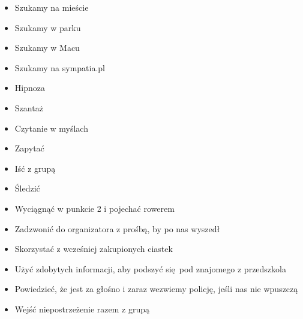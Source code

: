 \documentclass[10pt,a4paper]{protocol}
\begin{document}




\begin{fullwidth}
\makeheader
\end{fullwidth}


\begin{itemize}
	\item Szukamy na mieście
	\item Szukamy w parku
	\item Szukamy w Macu
	\item Szukamy na sympatia.pl
\end{itemize}
\divider

\begin{itemize}
	\item Hipnoza
	\item Szantaż
	\item Czytanie w myślach
	\item Zapytać
\end{itemize}
\divider

\begin{itemize}
	\item Iść z grupą
	\item Śledzić
	\item Wyciągnąć w punkcie 2 i pojechać rowerem
	\item Zadzwonić do organizatora z prośbą, by po nas wyszedł
\end{itemize}
\divider

\begin{itemize}
	\item Skorzystać z wcześniej zakupionych ciastek
	\item Użyć zdobytych informacji, aby podszyć się pod znajomego z przedszkola
	\item Powiedzieć, że jest za głośno i zaraz wezwiemy policję, jeśli nas nie wpuszczą
	\item Wejść niepostrzeżenie razem z grupą
\end{itemize}
\divider
\end{document}

